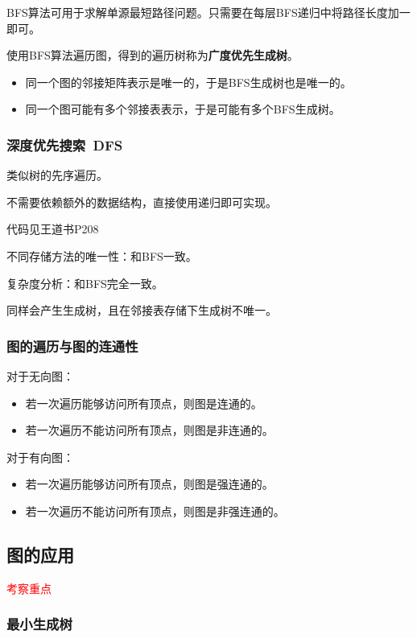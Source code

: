 \documentclass[12pt, a4paper, oneside]{ctexart}
\begin{document}
BFS算法可用于求解单源最短路径问题。只需要在每层BFS递归中将路径长度加一即可。

使用BFS算法遍历图，得到的遍历树称为\textbf{广度优先生成树}。
\begin{itemize}
  \item 同一个图的邻接矩阵表示是唯一的，于是BFS生成树也是唯一的。
  \item 同一个图可能有多个邻接表表示，于是可能有多个BFS生成树。
\end{itemize}

\subsubsection{深度优先搜索\ DFS}

类似树的先序遍历。

不需要依赖额外的数据结构，直接使用递归即可实现。

代码见王道书P208

不同存储方法的唯一性：和BFS一致。

复杂度分析：和BFS完全一致。

同样会产生生成树，且在邻接表存储下生成树不唯一。

\subsubsection{图的遍历与图的连通性}

对于无向图：
\begin{itemize}
  \item 若一次遍历能够访问所有顶点，则图是连通的。
  \item 若一次遍历不能访问所有顶点，则图是非连通的。
\end{itemize}

对于有向图：
\begin{itemize}
  \item 若一次遍历能够访问所有顶点，则图是强连通的。
  \item 若一次遍历不能访问所有顶点，则图是非强连通的。
\end{itemize}

\subsection{图的应用}

\textcolor{red}{考察重点}

\subsubsection{最小生成树}
\end{document}
